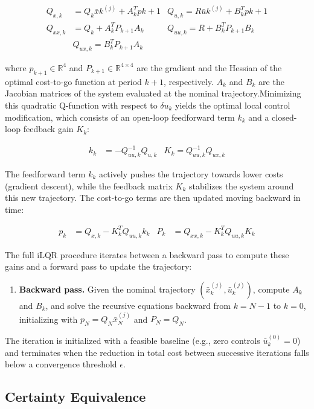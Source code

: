 \documentclass[12pt, a4paper]{article}
\begin{document}
\begin{align}Q_{x,k}  &= Q_k \bar{x}k^{(j)} + A_k^T p{k+1}   & Q_{u,k}= R \bar{u}k^{(j)} + B_k^T p{k+1}\\ Q_{xx,k} &= Q_k + A_k^T P_{k+1} A_k  & Q_{uu,k}= R + B_k^T P_{k+1} B_k\\  & Q_{ux,k}= B_k^T P_{k+1} A_k\end{align}

where $p_{k+1} \in \mathbb{R}^4$ and $P_{k+1} \in \mathbb{R}^{4 \times 4}$ are the gradient and the Hessian of the optimal cost-to-go function at period $k+1$, respectively. $A_k$ and $B_k$ are the Jacobian matrices of the system evaluated at the nominal trajectory.Minimizing this quadratic Q-function with respect to $\delta u_k$ yields the optimal local control modification, which consists of an open-loop feedforward term $k_k$ and a closed-loop feedback gain $K_k$:

\begin{align}k_k &= -Q_{uu,k}^{-1} Q_{u,k} &K_k= Q_{uu,k}^{-1} Q_{ux,k}\end{align}


The feedforward term $k_k$ actively pushes the trajectory towards lower costs (gradient descent), while the feedback matrix $K_k$ stabilizes the system around this new trajectory. The cost-to-go terms are then updated moving backward in time:

\begin{align}p_k &= Q_{x,k} - K_k^T Q_{uu,k} k_k & P_k &= Q_{xx,k} - K_k^T Q_{uu,k} K_k\end{align}

The full iLQR procedure iterates between a backward pass to compute these gains and a forward pass to update the trajectory:

\begin{enumerate}\item \textbf{Backward pass.} Given the nominal trajectory $(\bar{x}_k^{(j)}, \bar{u}_k^{(j)})$, compute $A_k$ and $B_k$, and solve the recursive equations backward from $k = N-1$ to $k = 0$, initializing with $p_N = Q_N \bar{x}_N^{(j)}$ and $P_N = Q_N$.\end{enumerate}The iteration is initialized with a feasible baseline (e.g., zero controls $\bar{u}_k^{(0)} = 0$) and terminates when the reduction in total cost between successive iterations falls below a convergence threshold $\epsilon$.
\subsection{Certainty Equivalence}
\label{sec:ce}
\end{document}
